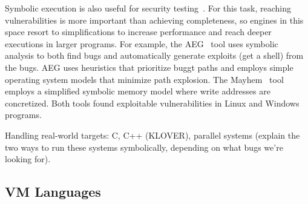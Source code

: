 







Symbolic execution is also useful for security testing~\cite{aeg,mayhem,bitBlaze}.  For this task, reaching vulnerabilities is more important than achieving completeness, so engines in this space resort to simplifications to increase performance and reach deeper executions in larger programs.
%
For example, the AEG~\cite{aeg} tool uses symbolic analysis to both find bugs and automatically generate exploits (get a shell) from the bugs.  AEG uses heuristics that prioritize buggt paths and employs simple operating system models that minimize path explosion.
%
The Mayhem~\cite{mayhem} tool employs a simplified symbolic memory model where write addresses are concretized.
%
Both tools found exploitable vulnerabilities in Linux and Windows programs.

Handling real-world targets: C, C++ (KLOVER), parallel systems (explain the two ways to run these systems symbolically, depending on what bugs we're looking for).

\subsection{VM Languages}


